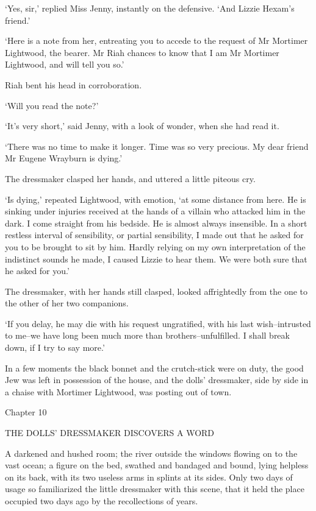 ‘Yes, sir,’ replied Miss Jenny, instantly on the defensive. ‘And Lizzie
Hexam’s friend.’

‘Here is a note from her, entreating you to accede to the request of
Mr Mortimer Lightwood, the bearer. Mr Riah chances to know that I am Mr
Mortimer Lightwood, and will tell you so.’

Riah bent his head in corroboration.

‘Will you read the note?’

‘It’s very short,’ said Jenny, with a look of wonder, when she had read
it.

‘There was no time to make it longer. Time was so very precious. My dear
friend Mr Eugene Wrayburn is dying.’

The dressmaker clasped her hands, and uttered a little piteous cry.

‘Is dying,’ repeated Lightwood, with emotion, ‘at some distance from
here. He is sinking under injuries received at the hands of a villain
who attacked him in the dark. I come straight from his bedside. He is
almost always insensible. In a short restless interval of sensibility,
or partial sensibility, I made out that he asked for you to be brought
to sit by him. Hardly relying on my own interpretation of the indistinct
sounds he made, I caused Lizzie to hear them. We were both sure that he
asked for you.’

The dressmaker, with her hands still clasped, looked affrightedly from
the one to the other of her two companions.

‘If you delay, he may die with his request ungratified, with his
last wish--intrusted to me--we have long been much more than
brothers--unfulfilled. I shall break down, if I try to say more.’

In a few moments the black bonnet and the crutch-stick were on duty, the
good Jew was left in possession of the house, and the dolls’ dressmaker,
side by side in a chaise with Mortimer Lightwood, was posting out of
town.



Chapter 10

THE DOLLS’ DRESSMAKER DISCOVERS A WORD


A darkened and hushed room; the river outside the windows flowing on
to the vast ocean; a figure on the bed, swathed and bandaged and bound,
lying helpless on its back, with its two useless arms in splints at its
sides. Only two days of usage so familiarized the little dressmaker
with this scene, that it held the place occupied two days ago by the
recollections of years.

